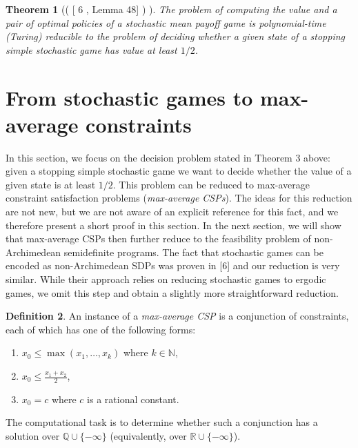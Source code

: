 \documentclass[10pt,a4paper]{article}
\newtheorem{theorem}{Theorem}
\theoremstyle{definition}
\newtheorem{definition}[theorem]{Definition}
\begin{document}
\setcounter{theorem}{2}
\begin{theorem}[{( [ 6 , Lemma 48] ) }]\label{Thmtheorem3}
The problem of computing the value and a pair of optimal policies of a stochastic mean payoff game is polynomial-time (Turing) reducible to the problem of deciding whether a given state of a stopping simple stochastic game has value at least $1/2$.

\end{theorem}

\section*{From stochastic games to max-average constraints}

In this section, we focus on the decision problem stated in Theorem 3 above: given a stopping simple stochastic game we want to decide whether the value of a given state is at least $1/2$. This problem can be reduced to max-average constraint satisfaction problems (\emph{max-average CSPs}). The ideas for this reduction are not new, but we are not aware of an explicit reference for this fact, and we therefore present a short proof in this section. In the next section, we will show that max-average CSPs then further reduce to the feasibility problem of non-Archimedean semidefinite programs. The fact that stochastic games can be encoded as non-Archimedean SDPs was proven in [6] and our reduction is very similar. While their approach relies on reducing stochastic games to ergodic games, we omit this step and obtain a slightly more straightforward reduction.

\setcounter{theorem}{3}
\begin{definition}\label{Thmtheorem4}
An instance of a \emph{max-average CSP} is a conjunction of constraints, each of which has one of the following forms:


\begin{enumerate}
\item $x_{0}\leq\max(x_{1},\dots,x_{k})$ where $k\in\mathbb{N}$,


\item $x_{0}\leq\frac{x_{1}+x_{2}}{2}$,


\item $x_{0}=c$ where $c$ is a rational constant.


\end{enumerate}
The computational task is to determine whether such a conjunction has a solution over $\mathbb{Q}\cup\{-\infty\}$ (equivalently, over $\mathbb{R}\cup\{-\infty\}$).

\end{definition}
\end{document}
